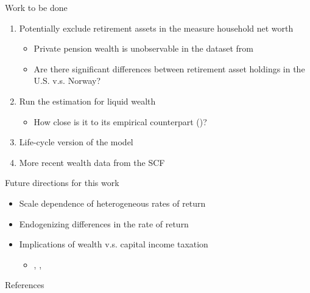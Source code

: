\documentclass{beamer}
\begin{document}
\begin{frame}{Work to be done}
       
       \begin{enumerate}
       \item Potentially exclude retirement assets in the measure household net worth 
       \begin{itemize}
      \item Private pension wealth is unobservable in the dataset from \cite{aflgdmlp20}
      \item Are there significant differences between retirement asset holdings in the U.S. v.s. Norway?
      \end{itemize}
       \item Run the estimation for liquid wealth
      \begin{itemize}
      \item How close is it to its empirical counterpart ()?
      \end{itemize}
      \item Life-cycle version of the model
      \item More recent wealth data from the SCF  
      \end{enumerate}
  
\end{frame}

\begin{frame}{Future directions for this work}
    \begin{itemize}
    \item Scale dependence of heterogeneous rates of return
    \item Endogenizing differences in the rate of return
    \item Implications of wealth v.s. capital income taxation
      \begin{itemize}
        \item \parencite{Benhabib2008}, \parencite{Benhabib2011}, \parencite{Guvenen2019}
      \end{itemize}
    \end{itemize}
\end{frame}


\begin{frame}[allowframebreaks]{References}
  \printbibliography
\end{frame}
\end{document}
